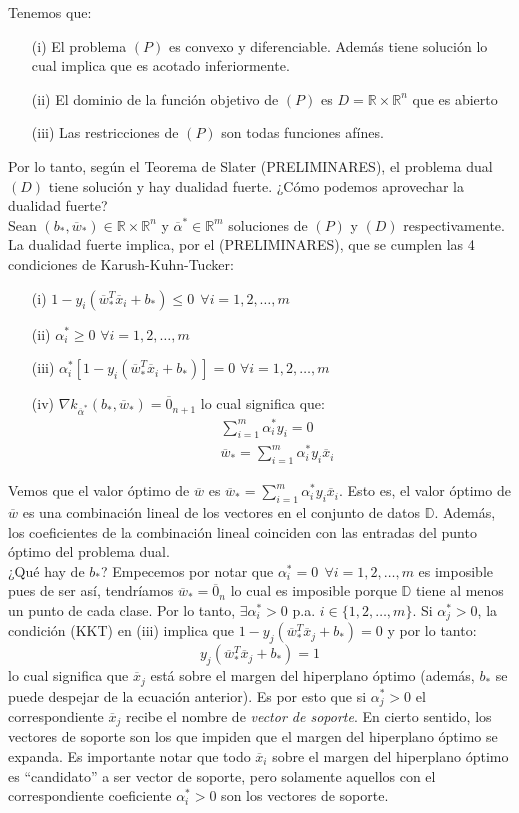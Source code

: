\documentclass[11pt]{article}
\newcommand{\R}{\mathbb{R}}
\newcommand{\Rn}{\R^{n}}
\newcommand{\Rm}{\R^{m}}
\newcommand{\Rnu}{\R\times\Rn}
\newcommand{\av}{\overline{\alpha}}
\newcommand{\wv}{\overline{w}}
\newcommand{\x}{\overline{x}}
\newcommand{\z}{\overline{0}_{n}}
\newcommand{\znu}{\overline{0}_{n+1}}
\newcommand{\Sm}{1,2,\ldots, m}
\newcommand{\bo}{b_{*}}
\newcommand{\wo}{\wv_{*}}
\newcommand{\avo}{\av^{*}}
\newcommand{\alio}{\alpha_{i}^{*}}
\newcommand{\aljo}{\alpha_{j}^{*}}
\newcommand{\Dat}{\mathbb{D}}
\begin{document}
Tenemos que:
\begin{itemize}
\item[(i)] El problema $(P)$ es convexo y diferenciable. Además tiene solución lo cual implica que es acotado inferiormente.
\item[(ii)] El dominio de la función objetivo de $(P)$ es $D=\Rnu$ que es abierto
\item[(iii)] Las restricciones de $(P)$ son todas funciones afínes.
\end{itemize}
Por lo tanto, según el Teorema de Slater (PRELIMINARES), el problema dual $(D)$ tiene solución y hay dualidad fuerte. ¿Cómo podemos aprovechar la dualidad fuerte?\\

Sean $(\bo, \wo)\in\Rnu$ y $\avo\in\Rm$ soluciones de $(P)$ y $(D)$ respectivamente. La dualidad fuerte implica, por el (PRELIMINARES), que se cumplen las 4 condiciones de Karush-Kuhn-Tucker:
\begin{itemize}
\item[(i)] $1-y_{i}(\wo^{T}\x_{i}+\bo)\leq0\ \ \forall i=\Sm$
\item[(ii)] $\alio\geq0$ $\forall i=\Sm$
\item[(iii)] $\alio[1-y_{i}(\wo^{T}\x_{i}+\bo)]=0$ $\forall i=\Sm$
\item[(iv)] $\nabla k_{\avo}(\bo, \wo)=\znu$ lo cual significa que:
\begin{equation*}
\begin{aligned}
&\sum_{i=1}^{m}\alio y_{i}=0\\
&\wo=\sum_{i=1}^{m}\alio y_{i}\x_{i}
\end{aligned}
\end{equation*}
\end{itemize}
Vemos que el valor óptimo de $\wv$ es $\wo=\sum_{i=1}^{m}\alio y_{i}\x_{i}$. Esto es, el valor óptimo de $\wv$ es una combinación lineal de los vectores en el conjunto de datos $\Dat$. Además, los coeficientes de la combinación lineal coinciden con las entradas del punto óptimo del problema dual.\\

¿Qué hay de $\bo$? Empecemos por notar que $\alio=0\ \ \forall i=\Sm$ es imposible pues de ser así, tendríamos $\wo=\z$ lo cual es imposible porque $\Dat$ tiene al menos un punto de cada clase. Por lo tanto, $\exists\alio>0$ p.a. $i\in\{1,2,\ldots,m\}$. Si $\aljo>0$, la condición (KKT) en (iii) implica que $1-y_{j}(\wo^{T}\x_{j}+\bo)=0$ y por lo tanto:
$$y_{j}(\wo^{T}\x_{j}+\bo)=1$$
lo cual significa que $\x_{j}$ está sobre el margen del hiperplano óptimo (además, $\bo$ se puede despejar de la ecuación anterior). Es por esto que si $\aljo>0$ el correspondiente $\x_{j}$ recibe el nombre de \emph{vector de soporte}. En cierto sentido, los vectores de soporte son los que impiden que el margen del hiperplano óptimo se expanda. Es importante notar que todo $\x_{i}$ sobre el margen del hiperplano óptimo es ``candidato'' a ser vector de soporte, pero solamente aquellos con el correspondiente coeficiente $\alio>0$ son los vectores de soporte.\\
\end{document}
